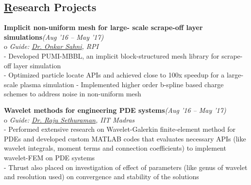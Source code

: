 \documentclass[margin,line]{res}
\begin{document}
\begin{resume}
\section {\sc \href{https://vickyragav95.github.io/research.html}Research Projects}
\textbullet\hspace{0.005cm} {\bf Implicit non-uniform mesh for large-
	scale scrape-off layer simulations}\hfill {\em (Aug '16 -- May '17)}\\
o {\em Guide: \href {https://homepages.rpi.edu/~sahni/} {\color{RoyalPurple} Dr. Onkar Sahni}, RPI}\\
- Developed PUMI-MBBL, an implicit block-structured
mesh library for scrape-off layer simulation\\
- Optimized particle locate APIs and achieved close to
100x speedup for a large-scale plasma simulation
- Implemented higher order b-spline based charge
schemes to address noise in non-uniform mesh

\textbullet\hspace{0.005cm} {\bf Wavelet methods for engineering PDE systems}\hfill {\em (Aug '16 -- May '17)}\\
o {\em Guide: \href {https://mech.iitm.ac.in/meiitm/personnal/raju-sethuraman/} {\color{RoyalPurple} Dr. Raju Sethuraman}, IIT Madras}\\
- Performed extensive research on Wavelet-Galerkin finite-element method for PDEs and developed custom MATLAB codes that evaluates necessary APIs (like wavelet integrals, moment terms and connection coefficients) to implement wavelet-FEM on PDE systems\\
- Thrust also placed on investigation of effect of parameters (like genus of wavelet and resolution used) on convergence and stability of the solutions


\end{resume}
\end{document}
